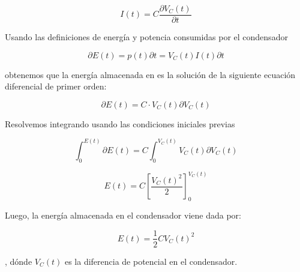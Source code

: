 \documentclass[../main.tex]{subfiles}
\begin{document}
$$I(t) = C \frac{\partial V_C(t)}{\partial t}$$

Usando las definiciones de energía y potencia consumidas por el condensador

$$\partial E(t) = p(t)  \partial t = V_C(t) I(t) \partial t $$

obtenemos que la energía almacenada en es la solución de la siguiente ecuación diferencial de primer orden:

$$\partial E(t) = C \cdot V_C(t) \partial V_C(t)$$

Resolvemos integrando usando las condiciones iniciales previas

$$\int_{0}^{E(t)} \partial E(t) = C \int_{0}^{V_C(t)} V_C(t) \partial V_C(t) $$

$$E(t) = C \left[ \frac{V_C(t)^2}{2} \right]_{0}^{V_C(t)}$$

Luego, la energía almacenada en el condensador viene dada por:

\begin{equation}
    E(t) = \frac{1}{2}CV_C(t)^2
\end{equation}

, dónde $V_C(t)$ es la diferencia de potencial en el condensador.
\end{document}
